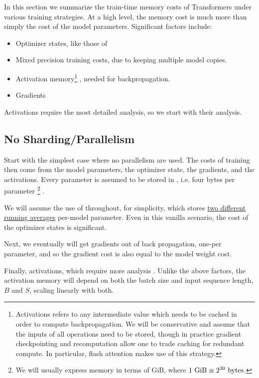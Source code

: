 \documentclass[11pt]{article}
\begin{document}
In this section we summarize the train-time memory costs of Transformers under various training
strategies.  At a high level, the memory cost is much more than simply the cost of the model
parameters. Significant factors include:
\begin{itemize}
\item Optimizer states, like those of 
\item Mixed precision training costs, due to keeping multiple model copies.
\item Activation memory\footnote{Activations refers to any intermediate value which needs to be
    cached in order to compute backpropagation. We will be conservative and assume that the inputs
of all operations need to be stored, though in practice gradient checkpointing and recomputation
allow one to trade caching for redundant compute. In particular, flash attention
\cite{dao2022flashattention} makes use of this strategy.} , needed for backpropagation.
\item Gradients
\end{itemize}


Activations require the most detailed analysis, so we start with their analysis.

\subsection{No Sharding/Parallelism}

Start with the simplest case where no parallelism are
used.  The costs of training then come from the model parameters, the optimizer state, the
gradients, and the activations. Every parameter is assumed to be stored in , i.e.
four bytes per parameter \footnote{We will usually express memory in terms of GiB, where $ 1\ {\rm
GiB}\equiv 2 ^{ 30 }\ {\rm bytes}  $.} .

We will assume the use of  throughout, for
simplicity, which stores \href{https://pytorch.org/docs/stable/generated/torch.optim.Adam.html}{two
different running averages} per-model parameter. Even in this vanilla scenario, the cost of the
optimizer states is significant.

Next, we eventually will get gradients out of back propagation, one-per parameter, and so the
gradient cost is also equal to the model weight cost.


Finally, activations, which require more analysis \cite{korthikanti2022reducing}. Unlike the above
factors, the activation memory will depend on both the batch size and input sequence length, $ B $
and $ S $, scaling linearly with both.
\end{document}
